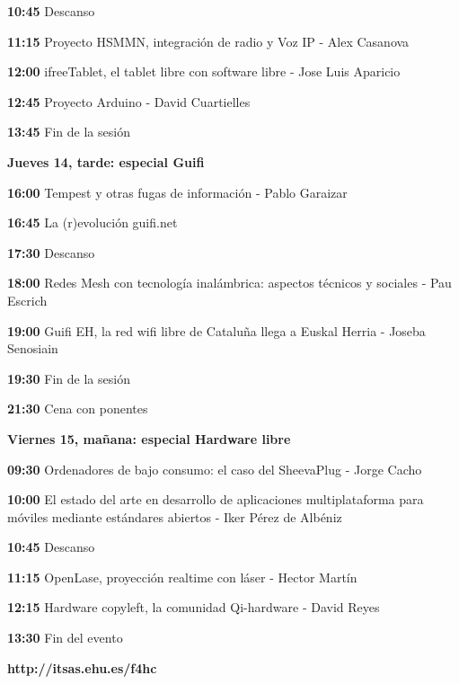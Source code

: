 \documentclass[a4paper,titlepage,11pt,oneside]{article}
\begin{document}
{\color{social}\textbf{10:45}} Descanso

{\color{charla}\textbf{11:15}} Proyecto HSMMN, integración de radio y Voz IP - Alex Casanova

{\color{charla}\textbf{12:00}} ifreeTablet, el tablet libre con software libre - Jose Luis Aparicio

{\color{charla}\textbf{12:45}} Proyecto Arduino - David Cuartielles

{\color{social}\textbf{13:45}} Fin de la sesión

\Large
\textbf{{\color{claro}Jueves 14, tarde:} {\color{oscuro} especial Guifi}}

\normalsize
{\color{charla}\textbf{16:00}} Tempest y otras fugas de información - Pablo Garaizar

{\color{charla}\textbf{16:45}} La (r)evolución guifi.net

{\color{social}\textbf{17:30}} Descanso

{\color{charla}\textbf{18:00}} Redes Mesh con tecnología inalámbrica: aspectos técnicos y sociales - Pau Escrich

{\color{charla}\textbf{19:00}} Guifi EH, la red wifi libre de Cataluña llega a Euskal Herria - Joseba Senosiain

{\color{social}\textbf{19:30}} Fin de la sesión

{\color{social}\textbf{21:30}} Cena con ponentes

\Large
\textbf{{\color{claro}Viernes 15, mañana:} {\color{oscuro} especial Hardware libre}}

\normalsize
{\color{charla}\textbf{09:30}} Ordenadores de bajo consumo: el caso del SheevaPlug - Jorge Cacho

{\color{charla}\textbf{10:00}} El estado del arte en desarrollo de aplicaciones multiplataforma para móviles mediante estándares abiertos - Iker Pérez de Albéniz

{\color{social}\textbf{10:45}} Descanso

{\color{charla}\textbf{11:15}} OpenLase, proyección realtime con láser - Hector Martín

{\color{charla}\textbf{12:15}} Hardware copyleft, la comunidad Qi-hardware - David Reyes

{\color{social}\textbf{13:30}} Fin del evento 

\begin{center}
\Huge{\textbf{\color{oscuro}http://itsas.ehu.es/f4hc}}
\end{center}
\end{document}
